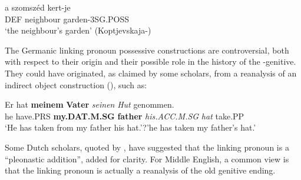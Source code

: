 {{%

\ea\label{}
\gll a  szomszéd  kert-je\\
DEF  neighbour  garden-3SG.POSS\\
\glt ‘the neighbour’s garden’ (Koptjevskaja-\citet[648]{Tamm2003}) 
\z

The Germanic linking pronoun possessive constructions are controversial, both with respect to their origin and their possible role in the history of the -genitive. They could have originated, as claimed by some scholars, from a reanalysis of an indirect object construction (\citet[638]{Behaghel1923}), such as:


\ea\label{}
\gll Er  hat  \textbf{meinem}\textbf{  Vater} \textit{seinen}\textit{  Hut}\textit{  }genommen.\\
he  have.PRS  \textbf{my.DAT.M.SG} \textbf{father} \textit{his.ACC.M.SG}\textit{  }\textit{hat}\textit{  }take.PP\\
\glt ‘He has taken from my father his hat.’?’he has taken my father’s hat.’
\z

Some Dutch scholars, quoted by \citet[58]{Norde1997}, have suggested that the linking pronoun is a “pleonastic addition”, added for clarity. For Middle English, a common view is that the linking pronoun  is actually a reanalysis of the old genitive ending.


}}
